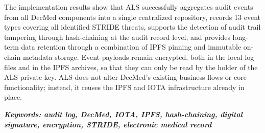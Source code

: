 \begin{singlespace}
	The implementation results show that ALS successfully aggregates audit events from all DecMed components into a single centralized repository, records 13 event types covering all identified STRIDE threats, supports the detection of audit trail tampering through hash-chaining at the audit record level, and provides long-term data retention through a combination of IPFS pinning and immutable on-chain metadata storage. Event payloads remain encrypted, both in the local log files and in the IPFS archives, so that they can only be read by the holder of the ALS private key. ALS does not alter DecMed's existing business flows or core functionality; instead, it reuses the IPFS and IOTA infrastructure already in place.

	\textbf{\textit{Keywords: audit log, DecMed, IOTA, IPFS, hash-chaining, digital signature, encryption, STRIDE, electronic medical record}}

\end{singlespace}
\clearpage